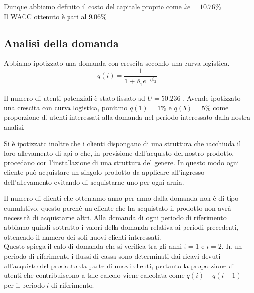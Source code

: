 Dunque abbiamo definito il costo del capitale proprio come $ke = 10.76\%$\\
Il WACC ottenuto è pari al $9.06\%$
\subsection{Analisi della domanda}
Abbiamo ipotizzato una domanda con crescita secondo una curva logistica. 
\begin{displaymath}
q(i) = \frac{1}{1 + \beta_1 e^{-i\beta_2}}
\end{displaymath}

Il numero di utenti potenziali è stato fissato ad $U=50.236$ \cite{miele}.
Avendo ipotizzato una crescita con curva logistica, poniamo $q(1)=1\%$ e
$q(5)=5\%$ come proporzione di utenti interessati alla domanda nel periodo
interessato dalla nostra analisi.  

Si è ipotizzato inoltre che i clienti dispongano di una struttura che
racchiuda il loro allevamento di api o che, in previsione dell’acquisto del
nostro prodotto, procedano con l’installazione di una struttura del genere. In
questo modo ogni cliente può acquistare un singolo prodotto da applicare
all’ingresso dell’allevamento evitando di acquistarne uno per ogni arnia.

Il numero di clienti che otteniamo anno per anno dalla domanda non è di tipo
cumulativo, questo perché un cliente che ha acquistato il prodotto non
avrà necessità di acquistarne altri. Alla domanda di ogni
periodo di riferimento abbiamo quindi sottratto i valori della domanda relativa ai
periodi precedenti, ottenendo il numero dei soli nuovi clienti interessati.\\
Questo spiega il calo di domanda che si verifica tra gli anni $t=1$ e $t=2$.
In un periodo di riferimento i flussi di cassa sono determinati dai ricavi
dovuti all’acquisto del prodotto da parte di nuovi clienti, pertanto la
proporzione di utenti che contribuiscono a tale calcolo viene calcolata come
$q(i) - q(i-1)$ per il periodo $i$ di riferimento.


